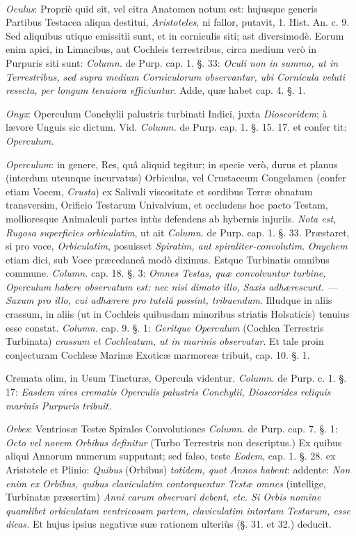 \documentclass[a4paper, 11pt, oneside, polutonikogreek, german]{article}
\begin{document}
\paragraph{}
\emph{Oculus}: Propriè quid sit, vel citra Anatomen notum est: hujusque generis Partibus Testacea aliqua destitui, \emph{Aristoteles}, ni fallor, putavit, 1. Hist. An. c. 9. Sed aliquibus utique emissitii sunt, et in corniculis siti; ast diversimodè. Eorum enim apici, in Limacibus, aut Cochleis terrestribus, circa medium verò in Purpuris siti sunt: \emph{Column.} de Purp. cap. 1. §. 33: \emph{Oculi non in summo, ut in Terrestribus, sed supra medium Corniculorum observantur, ubi Cornicula veluti resecta, per longum tenuiora efficiuntur}. Adde, quæ habet cap. 4. §. 1.

\emph{Onyx}: Operculum Conchylii palustris turbinati Indici, juxta \emph{Dioscoridem}; à lævore Unguis sic dictum. Vid. \emph{Column.} de Purp. cap. 1. §. 15. 17. et confer tit: \emph{Operculum}.

\emph{Operculum}: in genere, Res, quâ aliquid tegitur; in specie verò, durus et planus (interdum utcunque incurvatus) Orbiculus, vel Crustaceum Congelamen (confer etiam Vocem, \emph{Crusta}) ex Salivali viscositate et sordibus Terræ obnatum transversim, Orificio Testarum Univalvium, et occludens hoc pacto Testam, mollioresque Animalculi partes intùs defendens ab hybernis injuriis. \emph{Nota est, Rugosa superficies orbiculatim}, ut ait \emph{Column.} de Purp. cap. 1. §. 33. Præstaret, si pro voce, \emph{Orbiculatim}, posuisset \emph{Spiratim, aut spiraliter-convolutim}. \emph{Onychem} etiam dici, sub Voce præcedaneâ modò diximus. Estque Turbinatis omnibus commune. \emph{Column.} cap. 18. §. 3: \emph{Omnes Testas, quæ convolvuntur turbine, Operculum habere observatum est: nec nisi dimoto illo, Saxis adhærescunt. --- Saxum pro illo, cui adhærere pro tutelâ possint, tribuendum}. Illudque in aliis crassum, in aliis (ut in Cochleis quibusdam minoribus striatis Holsaticis) tenuius esse constat. \emph{Column.} cap. 9. §. 1: \emph{Geritque Operculum} (Cochlea Terrestris Turbinata) \emph{crassum et Cochleatum, ut in marinis observatur}. Et tale proin conjecturam Cochleæ Marinæ Exoticæ marmoreæ tribuit, cap. 10. §. 1.

Cremata olim, in Usum Tincturæ, Opercula videntur. \emph{Column.} de Purp. c. 1. §. 17: \emph{Easdem vires crematis Operculis palustris Conchylii, Dioscorides reliquis marinis Purpuris tribuit.}

\emph{Orbes}: Ventriosæ Testæ Spirales Convolutiones \emph{Column.} de Purp. cap. 7. §. 1: \emph{Octo vel novem Orbibus definitur} (Turbo Terrestris non descriptus.) Ex quibus aliqui Annorum numerum supputant; sed falso, teste \emph{Eodem}, cap. 1. §. 28. ex Aristotele et Plinio: \emph{Quibus} (Orbibus) \emph{totidem, quot Annos habent}: addente: \emph{Non enim ex Orbibus, quibus claviculatim contorquentur Testæ omnes} (intellige, Turbinatæ præsertim) \emph{Anni carum observari debent, etc. Si Orbis nomine quamlibet orbiculatam ventricosam partem, claviculatim intortam Testarum, esse dicas.} Et hujus ipsius negativæ suæ rationem ulteriùs (§. 31. et 32.) deducit.
\end{document}

